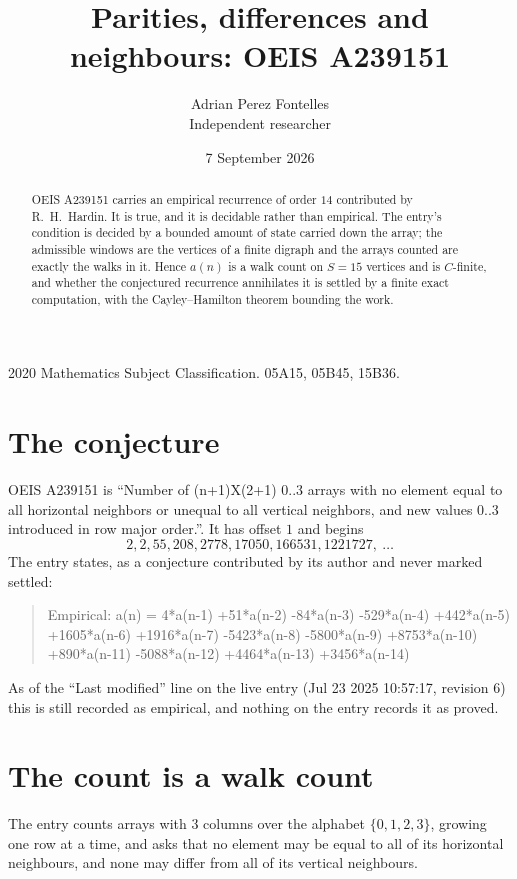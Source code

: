\documentclass[11pt,a4paper]{article}
\title{Parities, differences and neighbours: OEIS A239151}
\author{Adrian Perez Fontelles\\ \small Independent researcher}
\date{7 September 2026}
\theoremstyle{plain}
\theoremstyle{definition}
\begin{document}
\maketitle

\begin{abstract}
OEIS A239151 carries an empirical recurrence of order $14$ contributed by R.~H.~Hardin. It is
true, and it is decidable rather than empirical. The entry's condition is decided by a bounded amount of state carried down the array; the
admissible windows are the vertices of a finite digraph and the arrays counted are exactly the
walks in it. Hence $a(n)$ is a walk count on $S=15$ vertices and is $C$-finite, and whether the
conjectured recurrence annihilates it is settled by a finite exact computation, with the
Cayley--Hamilton theorem bounding the work.
\end{abstract}

\noindent\small 2020 Mathematics Subject Classification. 05A15, 05B45, 15B36.\normalsize

\section{The conjecture}

OEIS A239151 is ``Number of (n+1)X(2+1) 0..3 arrays with no element equal to all horizontal neighbors or unequal to all vertical neighbors, and new values 0..3 introduced in row major order.''. It has offset $1$ and begins
\[
2, 2, 55, 208, 2778, 17050, 166531, 1221727,\ \dots
\]
The entry states, as a conjecture contributed by its author and never marked settled:
\begin{quote}
Empirical: a(n) = 4*a(n-1) +51*a(n-2) -84*a(n-3) -529*a(n-4) +442*a(n-5) +1605*a(n-6) +1916*a(n-7) -5423*a(n-8) -5800*a(n-9) +8753*a(n-10) +890*a(n-11) -5088*a(n-12) +4464*a(n-13) +3456*a(n-14)
\end{quote}
As of the ``Last modified'' line on the live entry (Jul 23 2025 10:57:17, revision 6) this is still
recorded as empirical, and nothing on the entry records it as proved.

\section{The count is a walk count}

The entry counts arrays with $3$ columns over the alphabet $\{0,1,2,3\}$, growing one row at a time, and asks that no element may be equal to all of its horizontal neighbours, and none may differ from all of its vertical neighbours.
\end{document}
